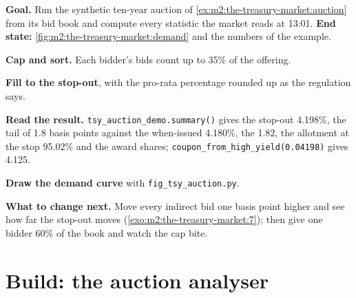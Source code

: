 \begin{tutorial}
\textbf{Goal.} Run the synthetic ten-year auction of
\cref{ex:m2:the-treasury-market:auction} from its bid book and compute every
statistic the market reads at 13:01. \textbf{End state:}
\cref{fig:m2:the-treasury-market:demand} and the numbers of the example.
\begin{tutsteps}
\item \textbf{Cap and sort.} Each bidder's bids count up to 35\% of the offering.
\label{lst:m2:the-treasury-market:cap}
\item \textbf{Fill to the stop-out}, with the pro-rata percentage rounded up as
the regulation says.
\label{lst:m2:the-treasury-market:run}
\item \textbf{Read the result.} \texttt{tsy\_auction\_demo.summary()} gives the
stop-out 4.198\%, the tail of 1.8 basis points against the when-issued 4.180\%,
the  1.82, the allotment at the stop 95.02\% and the award
shares; \texttt{coupon\_from\_high\_yield(0.04198)} gives 4.125.
\item \textbf{Draw the demand curve} with \texttt{fig\_tsy\_auction.py}.
\end{tutsteps}
\textbf{What to change next.} Move every indirect bid one basis point higher
and see how far the stop-out moves (\cref{exo:m2:the-treasury-market:7}); then
give one bidder 60\% of the book and watch the cap bite.
\end{tutorial}

\section{Build: the auction analyser}\label{bld:m2:the-treasury-market:auction}

